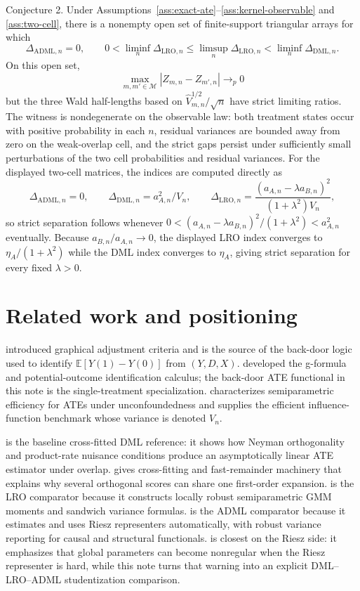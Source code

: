 \documentclass[11pt]{article}
\newcommand{\E}{\mathbb{E}}
\theoremstyle{definition}
\theoremstyle{plain}
\theoremstyle{remark}
\begin{document}
Conjecture 2.
Under Assumptions~\ref{ass:exact-ate}--\ref{ass:kernel-observable} and \ref{ass:two-cell}, there is a nonempty open set of finite-support triangular arrays for which
\[
  \Delta_{\mathrm{ADML},n}=0,\qquad
  0<\liminf_n\Delta_{\mathrm{LRO},n}
  \le \limsup_n\Delta_{\mathrm{LRO},n}
  < \liminf_n\Delta_{\mathrm{DML},n}.
\]
On this open set,
\[
  \max_{m,m'\in\mathcal M}|Z_{m,n}-Z_{m',n}|\to_p0
\]
but the three Wald half-lengths based on \(\hat V_{m,n}^{1/2}/\sqrt n\) have strict limiting ratios.  The witness is nondegenerate on the observable law: both treatment states occur with positive probability in each \(n\), residual variances are bounded away from zero on the weak-overlap cell, and the strict gaps persist under sufficiently small perturbations of the two cell probabilities and residual variances.  For the displayed two-cell matrices, the indices are computed directly as
\[
  \Delta_{\mathrm{ADML},n}=0,\qquad
  \Delta_{\mathrm{DML},n}=a_{A,n}^2/V_n,\qquad
  \Delta_{\mathrm{LRO},n}
  =
  \frac{(a_{A,n}-\lambda a_{B,n})^2}{(1+\lambda^2)V_n},
\]
so strict separation follows whenever \(0< (a_{A,n}-\lambda a_{B,n})^2/(1+\lambda^2)<a_{A,n}^2\) eventually.
Because \(a_{B,n}/a_{A,n}\to0\), the displayed LRO index converges to \(\eta_A/(1+\lambda^2)\) while the DML index converges to \(\eta_A\), giving strict separation for every fixed \(\lambda>0\).

\section{Related work and positioning}
\cite{Pearl1995CausalDiagrams} introduced graphical adjustment criteria and
is the source of the back-door logic used to identify
\(\E[Y(1)-Y(0)]\) from \((Y,D,X)\).  \cite{Robins1986GFormula} developed the
g-formula and potential-outcome identification calculus; the back-door ATE
functional in this note is the single-treatment specialization.
\cite{Hahn1998Efficiency} characterizes semiparametric efficiency for ATEs
under unconfoundedness and supplies the efficient influence-function benchmark
whose variance is denoted \(V_n\).

\cite{ChernozhukovEtAl2018DML} is the baseline cross-fitted DML reference: it
shows how Neyman orthogonality and product-rate nuisance conditions produce an
asymptotically linear ATE estimator under overlap.  \cite{NeweyRobins2018}
gives cross-fitting and fast-remainder machinery that explains why several
orthogonal scores can share one first-order expansion.  \cite{ChernozhukovEscancianoIchimuraNeweyRobins2022LRO}
is the LRO comparator because it constructs locally robust semiparametric GMM
moments and sandwich variance formulas.  \cite{ChernozhukovNeweySingh2022ADML}
is the ADML comparator because it estimates and uses Riesz representers
automatically, with robust variance reporting for causal and structural
functionals.  \cite{ChernozhukovNeweySingh2022RR} is closest on the Riesz side:
it emphasizes that global parameters can become nonregular when the Riesz
representer is hard, while this note turns that warning into an explicit
DML--LRO--ADML studentization comparison.
\end{document}
